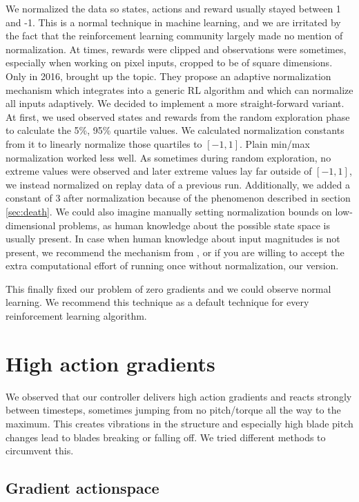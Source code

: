 \documentclass[hyperref,beleg]{cgvpub}
\begin{document}
We normalized the data so states, actions and reward usually stayed between 1 and -1. This is a normal technique in machine learning, and we are irritated by the fact that the reinforcement learning community largely made no mention of normalization. At times, rewards were clipped \cite{mnihPlayingAtariDeep2013} and observations were sometimes, especially when working on pixel inputs, cropped to be of square dimensions. Only in 2016, \cite{vanhasseltLearningValuesMany2016} brought up the topic. They propose an adaptive normalization mechanism which integrates into a generic \ac{RL} algorithm and which can normalize all inputs adaptively. We decided to implement a more straight-forward variant. At first, we used observed states and rewards from the random exploration phase to calculate the 5\%, 95\% quartile values. We calculated normalization constants from it to linearly normalize those quartiles to $[-1, 1]$. Plain min/max normalization worked less well. As sometimes during random exploration, no extreme values were observed and later extreme values lay far outside of $[-1, 1]$, we instead normalized on replay data of a previous run. Additionally, we added a constant of 3 after normalization because of the phenomenon described in section \ref{sec:death}. We could also imagine manually setting normalization bounds on low-dimensional problems, as human knowledge about the possible state space is usually present. In case when human knowledge about input magnitudes is not present, we recommend the mechanism from \cite{vanhasseltLearningValuesMany2016}, or if you are willing to accept the extra computational effort of running once without normalization, our version.

This finally fixed our problem of zero gradients and we could observe normal learning. We recommend this technique as a default technique for every reinforcement learning algorithm. 

\section{High action gradients}

We observed that our controller delivers high action gradients and reacts strongly between timesteps, sometimes jumping from no pitch/torque all the way to the maximum. This creates vibrations in the structure and especially high blade pitch changes lead to blades breaking or falling off. We tried different methods to circumvent this.

\subsection{Gradient actionspace}
\end{document}
